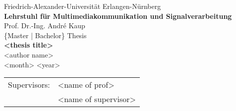\begin{titlepage}
    \vspace*{6ex}
    \begin{center}
        \LARGE
        Friedrich-Alexander-Universität Erlangen-Nürnberg\\[1.5ex]
        \Large
        \textbf{Lehrstuhl für Multimediakommunikation und Signalverarbeitung}\\[1.5ex]
        Prof. Dr.-Ing. André Kaup\\
        \vfill
        \LARGE
        \{Master | Bachelor\} Thesis\\[3ex]
        \textbf{<thesis title>}\\[3ex]
        <author name>\\
        \vfill
        \Large
        <month> <year>\\[1.5ex]
        \begin{tabular}{ll}
            Supervisors: & <name of prof>\\
            & <name of supervisor>
        \end{tabular}
    \end{center}
\end{titlepage}
